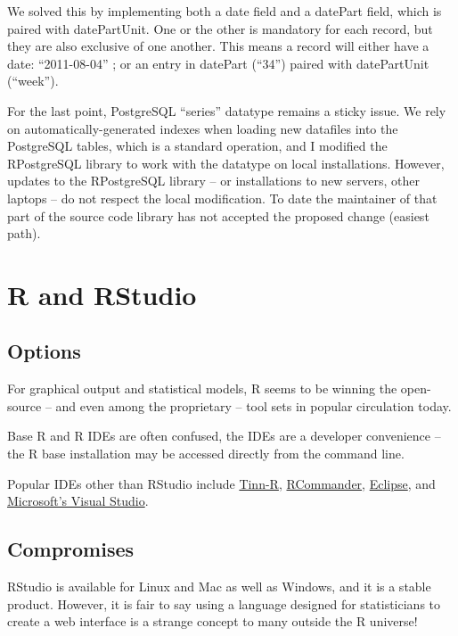 \documentclass[logos,parttoc,morelanguage=french,morelanguage=german,draft]{orsay-memoire}
\begin{document}
We solved this by implementing both a date field and a datePart field, which is paired with datePartUnit. One or the other is mandatory for each record, but they are also exclusive of one another. This means a record will either have a date: ``2011-08-04'' ; or an entry in datePart (``34'') paired with datePartUnit (``week'').

For the last point, PostgreSQL ``series'' datatype remains a sticky issue. We rely on automatically-generated indexes when loading new datafiles into the PostgreSQL tables, which is a standard operation, and I modified the RPostgreSQL library to work with the datatype on local installations. However, updates to the RPostgreSQL library -- or installations to new servers, other laptops -- do not respect the local modification. To date the maintainer of that part of the source code library has not accepted the proposed change (easiest path). 


\section{R and RStudio}

\subsection{Options}
For graphical output and statistical models, R seems to be winning the open-source -- and even among the proprietary -- tool sets in popular circulation today.

Base R and R IDEs are often confused, the IDEs are a developer convenience -- the R base installation may be accessed directly from the command line.

Popular IDEs other than RStudio include \href{https://sourceforge.net/projects/tinn-r/}{Tinn-R}, \href{https://cran.r-project.org/web/packages/Rcmdr/index.html}{RCommander}, \href{http://www.eclipse.org/downloads/packages/release/Luna/R}{Eclipse}, and \href{https://beta.visualstudio.com/vs/rtvs/}{Microsoft's Visual Studio}.

\subsection{Compromises}

RStudio is available for Linux and Mac as well as Windows, and it is a stable product. However, it is fair to say using a language designed for statisticians to create a web interface is a strange concept to many outside the R universe!
\end{document}
